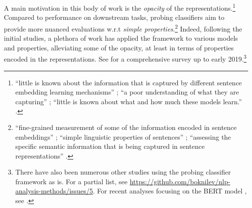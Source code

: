 \documentclass[discussion]{clv3}
\begin{document}
A main motivation in this body of work is the \emph{opacity} of the representations.\footnote{``little is known about the information that is captured by different sentence embedding learning mechanisms'' \cite{adi:2017:ICLR}; ``a poor understanding of what they are capturing'' \cite{conneau-etal-2018-cram}; ``little is known about what and how much these models learn.'' %
\cite{belinkov-etal-2017-neural}.} 
Compared to performance on downstream tasks, probing classifiers aim to provide more nuanced evaluations w.r.t \emph{simple properties}.\footnote{``fine-grained measurement of some of the information encoded in sentence embeddings'' \cite{adi:2017:ICLR}; ``simple linguistic properties of sentences'' \cite{conneau-etal-2018-cram}; ``assessing the specific semantic information that is being captured in sentence representations'' \cite{ettinger-etal-2016-probing}.} 
Indeed, following the initial studies, a plethora of work has applied the framework to various models and properties, alleviating some of the opacity, at least in terms of properties encoded in the representations. See \citet{belinkov-glass-2019-analysis} for a comprehensive survey up to early 2019.\footnote{There have also been numerous other studies using the probing classifier framework as is. For a partial list, see \url{https://github.com/boknilev/nlp-analysis-methods/issues/5}. For recent analyses focusing on the BERT model \cite{devlin-etal-2019-bert}, see  \citet{rogers-etal-2020-primer}.}  
\end{document}
